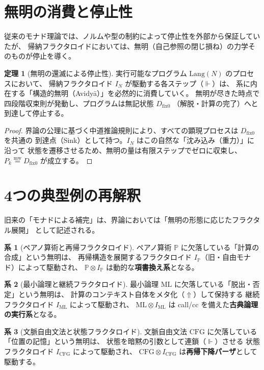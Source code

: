 \documentclass[11pt,a4paper]{article}
\theoremstyle{definition}
\newtheorem{theorem}{定理}[section]
\newtheorem{corollary}{系}[section]
\newcommand{\dfix}{D_{\mathrm{fix}0}} %
\newcommand{\mweq}{\mathrel{\overset{\mathrm{mw}}{=}}}
\newcommand{\metanegation}{\Uparrow}
\newcommand{\entails}{\Vdash} %
\begin{document}
\section{無明の消費と停止性}

従来のモナド理論では、ノルムや型の制約によって停止性を外部から保証していたが、
帰納フラクタロイドにおいては、無明（自己参照の閉じ損ね）の力学そのものが停止を導く。

\begin{theorem}[無明の還滅による停止性]
実行可能なプログラム $\text{Lang}(N)$ のプロセスにおいて、
帰納フラクタロイド $I_N$ が駆動する各ステップ（$\entails$）は、
系に内在する「構造的無明（Avidy\=a）」を必然的に消費していく。
無明が尽きた時点で四段階収束則が発動し、プログラムは無記状態 $\dfix$
（解脱・計算の完了）へと到達して停止する。
\end{theorem}
\begin{proof}
界論の公理に基づく中道推論規則により、すべての顕現プロセスは $\dfix$ を共通の
到達点（Sink）として持つ。$I_N$ はこの自然な「沈み込み（重力）」に沿って
状態を遷移させるため、無明の量は有限ステップでゼロに収束し、$P_k \mweq \dfix$ が成立する。
\end{proof}

\section{4つの典型例の再解釈}

旧来の「モナドによる補完」は、界論においては「無明の形態に応じたフラクタル展開」
として記述される。

\begin{corollary}[ペアノ算術と再帰フラクタロイド]
ペアノ算術 $\mathbb{P}$ に欠落している「計算の合成」という無明は、
再帰構造を展開するフラクタロイド $I_{\mathbb{P}}$（旧・自由モナド）によって駆動され、
$\mathbb{P} \otimes I_{\mathbb{P}}$ は動的な\textbf{項書換え系}となる。
\end{corollary}

\begin{corollary}[最小論理と継続フラクタロイド]
最小論理 $\mathrm{ML}$ に欠落している「脱出・否定」という無明は、
計算のコンテキスト自体をメタ化（$\metanegation$）して保持する
継続フラクタロイド $I_{\mathrm{ML}}$ によって駆動され、
$\mathrm{ML} \otimes I_{\mathrm{ML}}$ は call/cc を備えた\textbf{古典論理の実行系}となる。
\end{corollary}

\begin{corollary}[文脈自由文法と状態フラクタロイド]
文脈自由文法 $\mathrm{CFG}$ に欠落している「位置の記憶」という無明は、
状態を暗黙の引数として連鎖（$\entails$）させる
状態フラクタロイド $I_{\mathrm{CFG}}$ によって駆動され、
$\mathrm{CFG} \otimes I_{\mathrm{CFG}}$ は\textbf{再帰下降パーザ}として駆動する。
\end{corollary}
\end{document}
